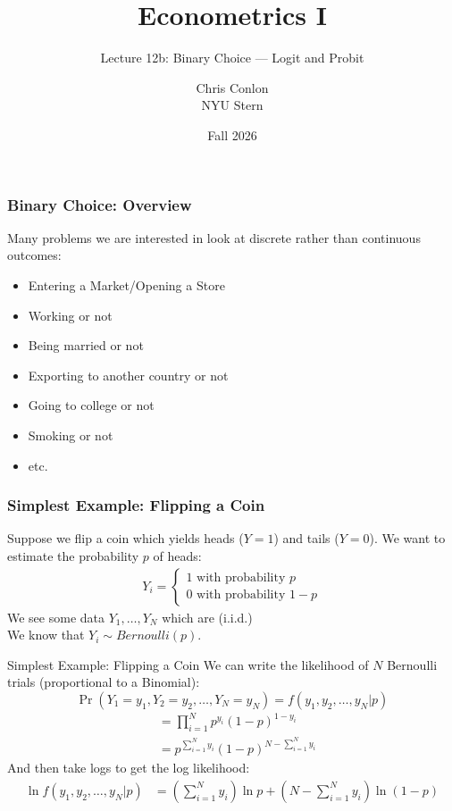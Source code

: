 \documentclass[aspectratio=169,11pt]{beamer}
\title[L12b - Logit and Probit]{ Econometrics I}
\subtitle{Lecture 12b: Binary Choice --- Logit and Probit}
\author{Chris Conlon \\NYU Stern}
\date{Fall 2026}
\begin{document}
\maketitle

\begin{frame}
\frametitle{Binary Choice: Overview}
Many problems we are interested in look at discrete rather than continuous outcomes:
\begin{itemize}
\item Entering a Market/Opening a Store
\item Working or not
\item Being married or not
\item Exporting to another country or not
\item Going to college or not
\item Smoking or not
\item etc.
\end{itemize}
\end{frame}

\begin{frame}
\frametitle{Simplest Example: Flipping a Coin}
Suppose we flip a coin which yields heads ($Y=1$) and tails ($Y=0$). We want to estimate the probability $p$ of heads:
\begin{align*}
Y_i =
\begin{cases}
1 \mbox{ with probability } p \\
0 \mbox{ with probability } 1-p
\end{cases}
\end{align*}
We see some data $Y_1,\ldots,Y_N$ which are (i.i.d.)\\
\vspace{0.2cm}
We know that $Y_i \sim Bernoulli(p)$.
\end{frame}


\begin{frame}{Simplest Example: Flipping a Coin}
We can write the likelihood of $N$ Bernoulli trials (proportional to a Binomial): 
$$\Pr(Y_1 = y_1, Y_2=y_2,\ldots,Y _N=y_N )  =  f(y_1,y_2,\ldots,y_N | p ) $$
\begin{align*}
&= \prod_{i=1}^N p^{y_i} (1-p)^{1-y_i}\\
&= p^{\sum_{i=1}^N y_i} (1-p)^{N-\sum_{i=1}^N y_i}
\end{align*}
And then take logs to get the \alert{log likelihood}:
\begin{align*}
\ln  f(y_1,y_2,\ldots,y_N | p )  &= \left( \sum_{i=1}^N y_i \right)  \ln p  + \left(N-\sum_{i=1}^N y_i \right)  \ln(1-p)
\end{align*}
\end{frame}
\end{document}
